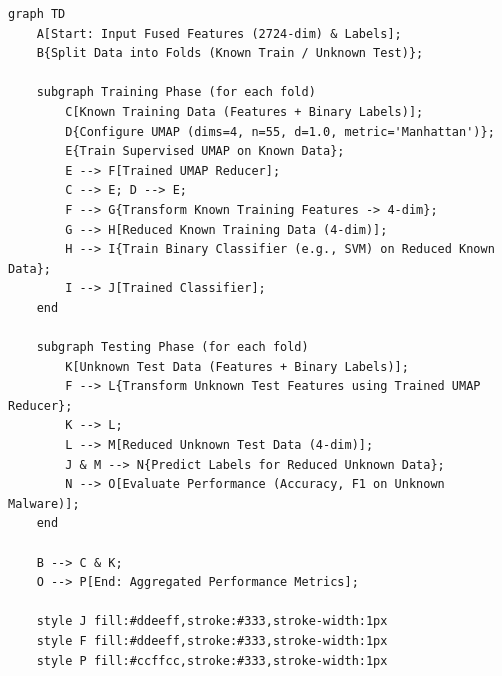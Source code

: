 \begin{verbatim}
graph TD
    A[Start: Input Fused Features (2724-dim) & Labels];
    B{Split Data into Folds (Known Train / Unknown Test)};
    
    subgraph Training Phase (for each fold)
        C[Known Training Data (Features + Binary Labels)];
        D{Configure UMAP (dims=4, n=55, d=1.0, metric='Manhattan')};
        E{Train Supervised UMAP on Known Data};
        E --> F[Trained UMAP Reducer];
        C --> E; D --> E;
        F --> G{Transform Known Training Features -> 4-dim};
        G --> H[Reduced Known Training Data (4-dim)];
        H --> I{Train Binary Classifier (e.g., SVM) on Reduced Known Data};
        I --> J[Trained Classifier];
    end
    
    subgraph Testing Phase (for each fold)
        K[Unknown Test Data (Features + Binary Labels)];
        F --> L{Transform Unknown Test Features using Trained UMAP Reducer};
        K --> L;
        L --> M[Reduced Unknown Test Data (4-dim)];
        J & M --> N{Predict Labels for Reduced Unknown Data};
        N --> O[Evaluate Performance (Accuracy, F1 on Unknown Malware)];
    end
    
    B --> C & K;
    O --> P[End: Aggregated Performance Metrics];

    style J fill:#ddeeff,stroke:#333,stroke-width:1px
    style F fill:#ddeeff,stroke:#333,stroke-width:1px
    style P fill:#ccffcc,stroke:#333,stroke-width:1px
\end{verbatim}
